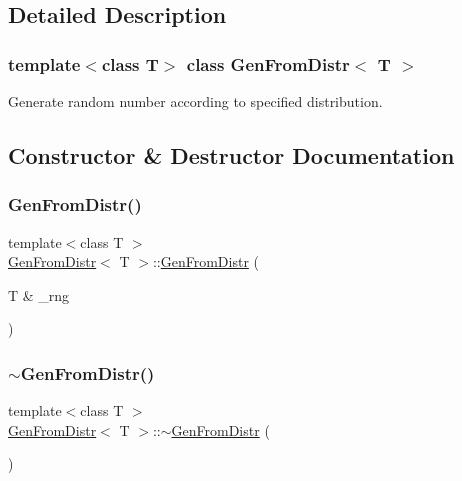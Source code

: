 \subsection{Detailed Description}
\subsubsection*{template$<$class T$>$\newline
class Gen\+From\+Distr$<$ T $>$}

Generate random number according to specified distribution. 

\subsection{Constructor \& Destructor Documentation}
\hypertarget{classGenFromDistr_a9e3401231ba07f8e84c760b892a9eb0a}{}\label{classGenFromDistr_a9e3401231ba07f8e84c760b892a9eb0a} 
\subsubsection{\texorpdfstring{Gen\+From\+Distr()}{GenFromDistr()}}
{\footnotesize\ttfamily template$<$class T $>$ \\
\hyperlink{classGenFromDistr}{Gen\+From\+Distr}$<$ T $>$\+::\hyperlink{classGenFromDistr}{Gen\+From\+Distr} (\begin{DoxyParamCaption}\item[{T \&}]{\+\_\+rng }\end{DoxyParamCaption})\hspace{0.3cm}{\ttfamily [inline]}}

\hypertarget{classGenFromDistr_a088eb8a16a206ccffbee7406fc840a90}{}\label{classGenFromDistr_a088eb8a16a206ccffbee7406fc840a90} 
\subsubsection{\texorpdfstring{$\sim$\+Gen\+From\+Distr()}{~GenFromDistr()}}
{\footnotesize\ttfamily template$<$class T $>$ \\
\hyperlink{classGenFromDistr}{Gen\+From\+Distr}$<$ T $>$\+::$\sim$\hyperlink{classGenFromDistr}{Gen\+From\+Distr} (\begin{DoxyParamCaption}{ }\end{DoxyParamCaption})\hspace{0.3cm}{\ttfamily [inline]}}



